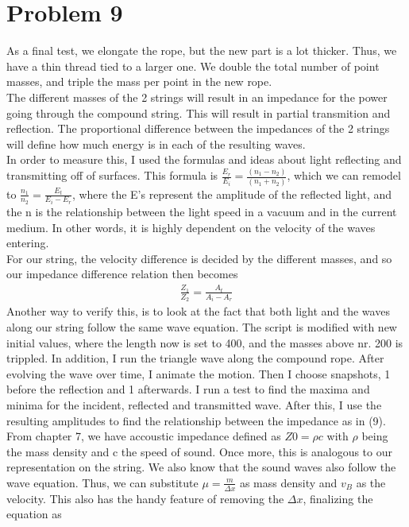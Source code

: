 \documentclass[12pt]{article}
\begin{document}
\section*{Problem 9}
	As a final test, we elongate the rope, but the new part is a lot thicker. Thus, we have a thin thread tied to a larger one. We double the total number of point masses, and triple the mass per point in the new rope.\\
	The different masses of the 2 strings will result in an impedance for the power going through the compound string. This will result in partial transmition and reflection. The proportional difference between the impedances of the 2 strings will define how much energy is in each of the resulting waves.\\
	In order to measure this, I used the formulas and ideas about light reflecting and transmitting off of surfaces. This formula is $\frac{E_r}{E_i} = \frac{(n_1 - n_2)}{(n_1 + n_2)}$, which we can remodel to $\frac{n_1}{n_2} = \frac{E_t}{E_i - E_r}$, where the E's represent the amplitude of the reflected light, and the n is the relationship between the light speed in a vacuum and in the current medium. In other words, it is highly dependent on the velocity of the waves entering. \\
	For our string, the velocity difference is decided by the different masses, and so our impedance difference relation then becomes 
	\begin{equation}
		\begin{aligned}
			\frac{Z_1}{Z_2} = \frac{A_t}{A_i - A_r}
		\end{aligned}
	\end{equation} 
	Another way to verify this, is to look at the fact that both light and the waves along our string follow the same wave equation. 
	The script is modified with new initial values, where the length now is set to 400, and the masses above nr. 200 is trippled. In addition, I run the triangle wave along the compound rope. After evolving the wave over time, I animate the motion. Then I choose snapshots, 1 before the reflection and 1 afterwards. I run a test to find the maxima and minima for the incident, reflected and transmitted wave. After this, I use the resulting amplitudes to find the relationship between the impedance as in (9). From chapter 7, we have accoustic impedance defined as $Z0 = \rho c$ with $\rho$ being the mass density and c the speed of sound. Once more, this is analogous to our representation on the string. We also know that the sound waves also follow the wave equation. Thus, we can substitute $\mu = \frac{m}{\Delta x}$ as mass density and $v_B$ as the velocity. This also has the handy feature of removing the $\Delta x$, finalizing the equation as
\end{document}
